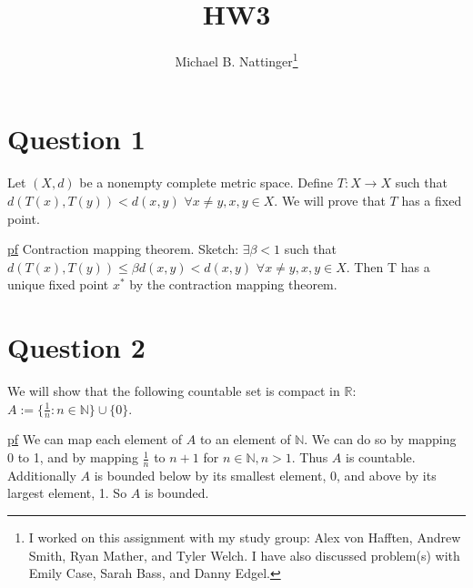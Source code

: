 \documentclass[11pt]{article} %
\title{HW3}
\author{Michael B. Nattinger\footnote{I worked on this assignment with my study group: Alex von Hafften, Andrew Smith, Ryan Mather, and Tyler Welch. I have also discussed problem(s) with Emily Case, Sarah Bass, and Danny Edgel.}}
\begin{document}
\maketitle

\section{Question 1}
Let $(X, d)$ be a nonempty complete metric space. Define $T: X \rightarrow X$ such that $d(T(x),T(y))<d(x,y)$ $\forall x \neq y, x,y \in X.$ We will prove that $T$ has a fixed point.

\underline{pf} Contraction mapping theorem. Sketch: $\exists \beta <1$ such that $d(T(x),T(y))\leq \beta d(x,y)<d(x,y)$ $\forall x \neq y, x,y \in X.$ Then T has a unique fixed point $x^*$ by the contraction mapping theorem.

\section{Question 2}
We will show that the following countable set is compact in $\mathbb{R}$: $A:= \{ \frac{1}{n}: n \in \mathbb{N}\} \cup \{ 0 \}$.

\underline{pf} We can map each element of $A$ to an element of $\mathbb{N}$. We can do so by mapping 0 to 1, and by mapping $\frac{1}{n}$ to $n+1$ for $n \in \mathbb{N}, n>1.$ Thus $A$ is countable. Additionally $A$ is bounded below by its smallest element, 0, and above by its largest element, 1. So $A$ is bounded.
\end{document}
